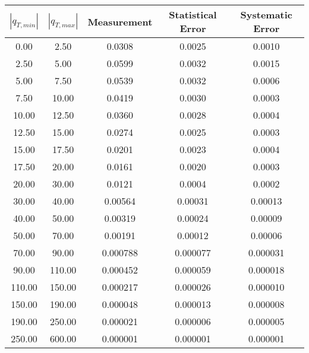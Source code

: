 \begin{tabular}{|c|c||c|c|c|}
\hline
$|q_{T,min}|$ & $|q_{T,max}|$ & Measurement & Statistical Error & Systematic Error \\ \hline
   0.00 &    2.50 &  0.0308 &  0.0025 &  0.0010 \\ 
   2.50 &    5.00 &  0.0599 &  0.0032 &  0.0015 \\ 
   5.00 &    7.50 &  0.0539 &  0.0032 &  0.0006 \\ 
   7.50 &   10.00 &  0.0419 &  0.0030 &  0.0003 \\ 
  10.00 &   12.50 &  0.0360 &  0.0028 &  0.0004 \\ 
  12.50 &   15.00 &  0.0274 &  0.0025 &  0.0003 \\ 
  15.00 &   17.50 &  0.0201 &  0.0023 &  0.0004 \\ 
  17.50 &   20.00 &  0.0161 &  0.0020 &  0.0003 \\ 
  20.00 &   30.00 &  0.0121 &  0.0004 &  0.0002 \\ 
  30.00 &   40.00 & 0.00564 & 0.00031 & 0.00013 \\ 
  40.00 &   50.00 & 0.00319 & 0.00024 & 0.00009 \\ 
  50.00 &   70.00 & 0.00191 & 0.00012 & 0.00006 \\ 
  70.00 &   90.00 & 0.000788 & 0.000077 & 0.000031 \\ 
  90.00 &  110.00 & 0.000452 & 0.000059 & 0.000018 \\ 
 110.00 &  150.00 & 0.000217 & 0.000026 & 0.000010 \\ 
 150.00 &  190.00 & 0.000048 & 0.000013 & 0.000008 \\ 
 190.00 &  250.00 & 0.000021 & 0.000006 & 0.000005 \\ 
 250.00 &  600.00 & 0.000001 & 0.000001 & 0.000001 \\ 
\hline
\end{tabular}